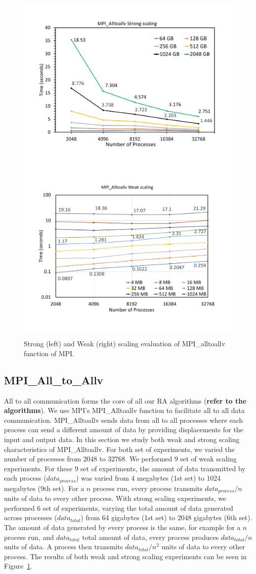 \begin{figure}[t]
	{\includegraphics[width=.50\textwidth,  trim={0cm 0cm 0cm 0cm, 
			clip}]{results/all_to_all_strong.pdf}}\hfill%
	{\includegraphics[width=.50\textwidth,  trim={0cm 0cm 0cm 0cm,
			clip}]{results/all_to_all_weak.pdf}}\hfill%
	\centering
	\caption{Strong (left) and Weak (right) scaling evaluation of MPI\_alltoallv function of MPI.}
	\label{fig:all_to_all}
\end{figure}


\subsection{MPI\_All\_to\_Allv}
\label{sec:all_to_all}


All to all communication forms the core of all our RA algorithms (\textbf{refer to the algorithms}).
We use MPI's MPI\_Alltoallv function to facilitate all to all data communication.
MPI\_Alltoallv sends data from all to all processes where each process can send a different amount of data by providing displacements for the input and output data. In this section we study both weak and strong scaling characteristics of MPI\_Alltoallv.
For both set of experiments, we varied the number of processes from $2048$ to $32768$. We performed 9 set of weak scaling experiments. For these 9 set of experiments, the amount of data transmitted by each process ($data_{process}$) was varied from 4 megabytes (1st set) to 1024 megabytes (9th set). For a $n$ process run, every process transmits $data_{process}/n$ units of data to every other process. With strong scaling experiments, we performed 6 set of experiments, varying the total amount of data generated across processes ($data_{total}$) from 64 gigabytes (1st set) to 2048 gigabytes (6th set). The amount of data generated by every process is the same, for example for a $n$ process run, and $data_{total}$ total amount of data, every process produces $data_{total}/n$ units of data. A process then transmits $data_{total}/n^2$ units of data to every other process.  The results of both weak and strong scaling experiments can be seen in Figure~\ref{fig:all_to_all}.

